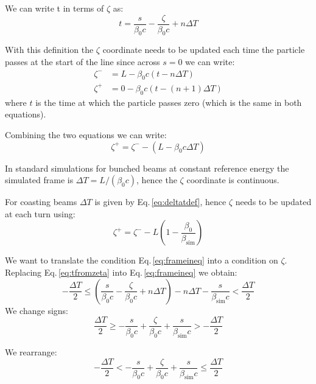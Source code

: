We can write t in terms of $\zeta$ as:
\begin{equation}
 t = \frac{s}{\beta_0 c}  - \frac{\zeta}{\beta_0 c} + n\Delta T
 \label{eq:tfromzeta}
\end{equation}

With this definition the $\zeta$ coordinate needs to be updated each time the particle passes at the start of the line since across $s=0$ we can write:
\begin{align}
\zeta^- &= L - \beta_0 c (t - n\Delta T)\\
\zeta^+ &= 0 - \beta_0 c (t - (n+1)\Delta T)
\end{align}
where $t$ is the time at which the particle passes zero (which is the same in both equations).

Combining the two equations we can write:
\begin{equation}
\zeta^+ = \zeta^- - (L - \beta_0 c \Delta T)
\end{equation}

In standard simulations for bunched beams at constant reference energy the simulated frame is $\Delta T = L / (\beta_0 c)$, hence the $\zeta$ coordinate is continuous.

For coasting beams $\Delta T$ is given by Eq.\,\ref{eq:deltatdef}, hence $\zeta$ needs to be updated at each turn using:
\begin{equation}
\boxed{
\zeta^+ = \zeta^- - L\left(1 - \frac{\beta_0}{\beta_\text{sim}} \right)
}
\end{equation}

We want to translate the condition Eq.\,\ref{eq:frameineq} into a condition on $\zeta$. Replacing Eq.\,\ref{eq:tfromzeta} into Eq.\,\ref{eq:frameineq} we obtain:
\begin{equation}
- \frac{\Delta T}{2} \leq \left(\frac{s}{\beta_0 c}  - \frac{\zeta}{\beta_0 c} + n \Delta T\right) - n \Delta T - \frac{s}{\beta_\text{sim} c} < \frac{\Delta T}{2}
\end{equation}
We change signs:
\begin{equation}
\frac{\Delta T}{2} \geq -\frac{s}{\beta_0 c}  + \frac{\zeta}{\beta_0 c} + \frac{s}{\beta_\text{sim} c} > -\frac{\Delta T}{2}
\end{equation}

We rearrange:
\begin{equation}
-\frac{\Delta T}{2} < -\frac{s}{\beta_0 c}  + \frac{\zeta}{\beta_0 c} + \frac{s}{\beta_\text{sim} c} \leq \frac{\Delta T}{2}
\end{equation}

